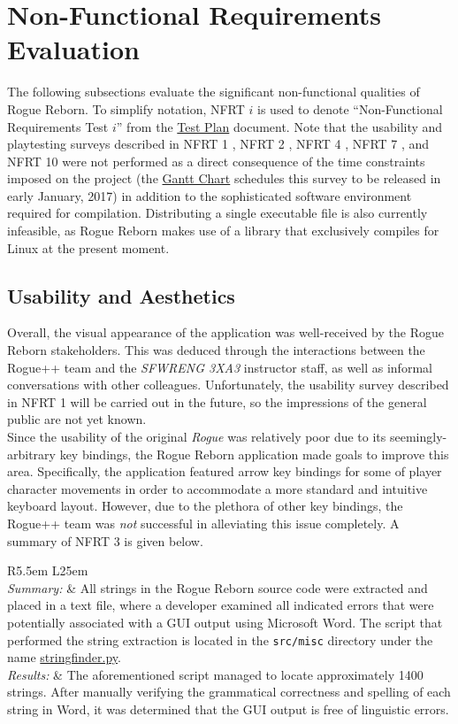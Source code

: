 \documentclass[12pt, titlepage]{article}
\newcommand{\newsection}[1]{
  \newpage
  \section{#1}
}
\newcommand{\nfrt}[1]{
	NFRT #1
}
\newcommand{\nfrtc}[3]{
	\begin{center}
		\def\arraystretch{1.6}
		\begin{tabular}{ R{5.5em} L{25em} }
			\bottomrule
			\multicolumn{2}{ c }{\textbf{Non-Functional Requirement Test} \# #1 \textbf{Summary}}  \\
			\hline
			\textit{Summary:} & #2 \\
			\textit{Results:} & #3 \\
			\toprule
		\end{tabular}
	\end{center}
}
\begin{document}
\newsection{Non-Functional Requirements Evaluation} \label{Section_NFR_Evaluation}
	The following subsections evaluate the significant non-functional qualities of Rogue Reborn.  To simplify notation, \nfrt{$i$} is used to denote ``Non-Functional Requirements Test $i$'' from the \href{run:../TestPlan/TestPlan.pdf}{Test Plan} document.  Note that the usability and playtesting surveys described in \nfrt{1}, \nfrt{2}, \nfrt{4}, \nfrt{7}, and \nfrt{10} were not performed as a direct consequence of the time constraints imposed on the project (the \href{run:../../ProjectSchedule/rogue.gan}{Gantt Chart} schedules this survey to be released in early January, 2017) in addition to the sophisticated software environment required for compilation.  Distributing a single executable file is also currently infeasible, as Rogue Reborn makes use of a library that exclusively compiles for Linux at the present moment.

	\subsection{Usability and Aesthetics}
		Overall, the visual appearance of the application was well-received by the Rogue Reborn stakeholders.  This was deduced through the interactions between the Rogue++ team and the \textit{SFWRENG 3XA3} instructor staff, as well as informal conversations with other colleagues.  Unfortunately, the usability survey described in \nfrt{1} will be carried out in the future, so the impressions of the general public are not yet known.\\

		Since the usability of the original \textit{Rogue} was relatively poor due to its seemingly-arbitrary key bindings, the Rogue Reborn application made goals to improve this area.  Specifically, the application featured arrow key bindings for some of player character movements in order to accommodate a more standard and intuitive keyboard layout.  However, due to the plethora of other key bindings, the Rogue++ team was \textit{not} successful in alleviating this issue completely.  A summary of \nfrt{3} is given below.

		\nfrtc {3}
			{All strings in the Rogue Reborn source code were extracted and placed in a text file, where a developer examined all indicated errors that were potentially associated with a GUI output using Microsoft Word.  The script that performed the string extraction is located in the \lstinline$src/misc$  directory under the name \href{run:../../src/misc/stringfinder.py}{stringfinder.py}.}
			{The aforementioned script managed to locate approximately 1400 strings.  After manually verifying the grammatical correctness and spelling of each string in Word, it was determined that the GUI output is free of linguistic errors.}
\end{document}

